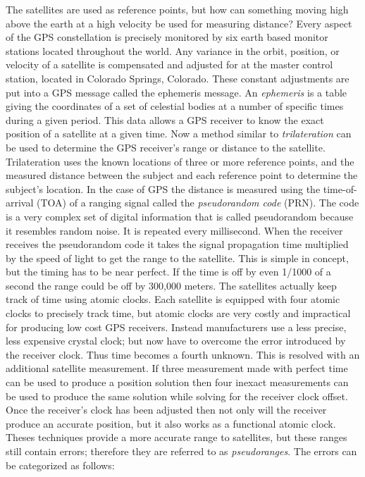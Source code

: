 The satellites are used as reference points, but how can something moving high above the earth at a high velocity be used for measuring distance?  Every aspect of the GPS constellation is precisely monitored by six earth based monitor stations located throughout the world.  Any variance in the orbit, position, or velocity of a satellite is compensated and adjusted for at the master control station, located in Colorado Springs, Colorado.  These constant adjustments are put into a GPS message called the ephemeris message.  An \textit{ephemeris} is a table giving the coordinates of a set of celestial bodies at a number of specific times during a given period.  This data allows a GPS receiver to know the exact position of a satellite at a given time.  Now a method similar to \textit{trilateration} can be used to determine the GPS receiver's range or distance to the satellite. Trilateration uses the known locations of three or more reference points, and the measured distance between the subject and each reference point to determine the subject's location. In the case of GPS the distance is measured using the time-of-arrival (TOA) of a ranging signal called the \textit{pseudorandom code} (PRN). The code is a very complex set of digital information that is called pseudorandom because it resembles random noise. It is repeated every millisecond. When the receiver receives the pseudorandom code it takes the signal propagation time multiplied by the speed of light to get the range to the satellite.  This is simple in concept, but the timing has to be near perfect.  If the time is off by even 1/1000 of a second the range could be off by 300,000 meters.  The satellites actually keep track of time using atomic clocks.  Each satellite is equipped with four atomic clocks to precisely track time, but atomic clocks are very costly and impractical for producing low cost GPS receivers.  Instead manufacturers use a less precise, less expensive crystal clock; but now have to overcome the error introduced by the receiver clock. Thus time becomes a fourth unknown. This is resolved with an additional satellite measurement. If three measurement made with perfect time can be used to produce a position solution then four inexact measurements can be used to produce the same solution while solving for the receiver clock offset.  Once the receiver's clock has been adjusted then not only will the receiver produce an accurate position, but it also works as a functional atomic clock.  Theses techniques provide a more accurate range to satellites, but these ranges still contain errors; therefore they are referred to as \textit{pseudoranges}.  The errors can be categorized as follows:

